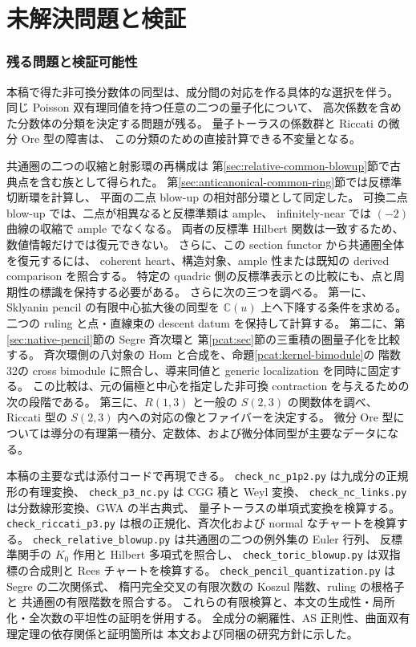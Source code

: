 \documentclass[11pt,a4paper]{ltjsarticle}
\theoremstyle{definition}
\begin{document}
\part{未解決問題と検証}
\section{残る問題と検証可能性}

本稿で得た非可換分数体の同型は、成分間の対応を作る具体的な選択を伴う。
同じ Poisson 双有理同値を持つ任意の二つの量子化について、
高次係数を含めた分数体の分類を決定する問題が残る。
量子トーラスの係数群と Riccati の微分 Ore 型の障害は、
この分類のための直接計算できる不変量となる。

共通圏の二つの収縮と射影環の再構成は
第\ref{sec:relative-common-blowup}節で古典点を含む族として得られた。
第\ref{sec:anticanonical-common-ring}節では反標準切断環を計算し、
平面の二点 blow-up の相対部分環として同定した。
可換二点 blow-up では、二点が相異なると反標準類は ample、
infinitely-near では $(-2)$ 曲線の収縮で ample でなくなる。
両者の反標準 Hilbert 関数は一致するため、数値情報だけでは復元できない。
さらに、この section functor から共通圏全体を復元するには、
coherent heart、構造対象、ample 性または既知の derived comparison を照合する。
特定の quadric 側の反標準表示との比較にも、点と周期性の標識を保持する必要がある。
さらに次の三つを調べる。
第一に、Sklyanin pencil の有限中心拡大後の同型を
$\mathbb C(u)$ 上へ下降する条件を求める。
二つの ruling と点・直線束の descent datum を保持して計算する。
第二に、第\ref{sec:native-pencil}節の Segre 斉次環と
第\ref{pcat:sec}節の三重積の圏量子化を比較する。
斉次環側の八対象の Hom と合成を、命題\ref{pcat:kernel-bimodule}の
階数32の cross bimodule に照合し、導来同値と generic localization を同時に固定する。
この比較は、元の偏極と中心を指定した非可換 contraction を与えるための次の段階である。
第三に、$R(1,3)$ と一般の $S(2,3)$ の関数体を調べ、
Riccati 型の $S(2,3)$ 内への対応の像とファイバーを決定する。
微分 Ore 型については導分の有理第一積分、定数体、および微分体同型が主要なデータになる。

本稿の主要な式は添付コードで再現できる。
\texttt{check\_nc\_p1p2.py} は九成分の正規形の有理変換、
\texttt{check\_p3\_nc.py} は CGG 積と Weyl 変換、
\texttt{check\_nc\_links.py} は分数線形変換、GWA の半古典式、
量子トーラスの単項式変換を検算する。
\texttt{check\_riccati\_p3.py} は根の正規化、斉次化および normal なチャートを検算する。
\texttt{check\_relative\_blowup.py} は共通圏の二つの例外集の Euler 行列、
反標準関手の $K_0$ 作用と Hilbert 多項式を照合し、
\texttt{check\_toric\_blowup.py} は双指標の合成則と Rees チャートを検算する。
\texttt{check\_pencil\_quantization.py} は Segre の二次関係式、
楕円完全交叉の有限次数の Koszul 階数、ruling の根格子と
共通圏の有限階数を照合する。
これらの有限検算と、本文の生成性・局所化・全次数の平坦性の証明を併用する。
全成分の網羅性、AS 正則性、曲面双有理定理の依存関係と証明箇所は
本文および同梱の研究方針に示した。
\end{document}
